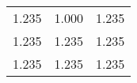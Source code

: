 \begin{table}
    \centering
    \begin{tabular}{ccc}
        \toprule
        1.235 & 1.000 & 1.235 \\
        1.235 & 1.235 & 1.235 \\
        1.235 & 1.235 & 1.235 \\
        \bottomrule
    \end{tabular}
\end{table}
